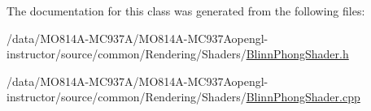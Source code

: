 The documentation for this class was generated from the following files\+:\begin{DoxyCompactItemize}
\item
/data/MO814A-MC937A/MO814A-MC937Aopengl-\/instructor/source/common/\+Rendering/\+Shaders/\hyperlink{_blinn_phong_shader_8h}{Blinn\+Phong\+Shader.\+h}\item
/data/MO814A-MC937A/MO814A-MC937Aopengl-\/instructor/source/common/\+Rendering/\+Shaders/\hyperlink{_blinn_phong_shader_8cpp}{Blinn\+Phong\+Shader.\+cpp}\end{DoxyCompactItemize}
